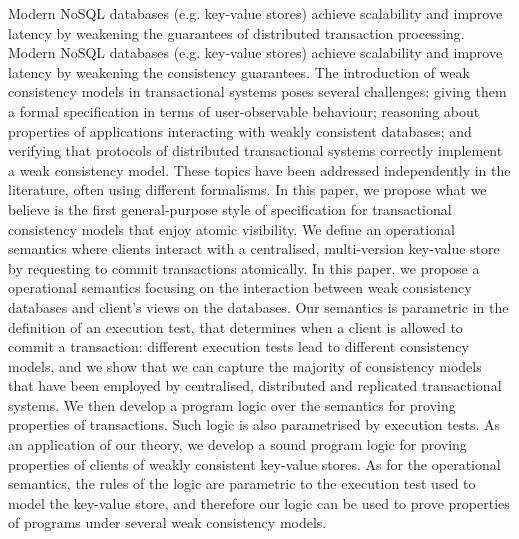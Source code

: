 \ac{Modern NoSQL databases (e.g. key-value stores) achieve scalability and improve 
latency by weakening the guarantees of distributed transaction 
processing. }
Modern NoSQL databases (e.g. key-value stores) achieve scalability and improve 
latency by weakening the consistency guarantees. 
The introduction of weak consistency models in transactional systems 
poses several challenges: giving them a formal specification in terms 
of user-observable behaviour; reasoning about properties of applications 
interacting with weakly consistent databases; and verifying that protocols 
of distributed transactional systems correctly implement a weak consistency model. 
These topics have been addressed independently in the literature, often using 
different formalisms. 
\ac{
In this paper, we propose what we believe is the first general-purpose style 
of specification for transactional consistency models that enjoy atomic visibility. 
We define an operational semantics where clients interact with a centralised, 
multi-version key-value store by requesting to commit transactions atomically. }
In this paper, we propose a operational semantics focusing on the interaction between 
weak consistency databases and client's views on the databases.
Our semantics is parametric in the definition of an execution test, that determines 
when a client is allowed to commit a transaction: different execution tests lead 
to different consistency models, and we show that we can capture the majority 
of consistency models that have been employed by centralised, distributed and replicated 
transactional systems. 
We then develop a program logic over the semantics for proving properties of transactions.
Such logic is also parametrised by execution tests.
\ac{
As an application of our theory, we develop a sound program logic for 
proving properties of clients of weakly consistent key-value stores. 
As for the operational semantics, the rules of the logic are parametric to the execution 
test used to model the key-value store, and therefore our logic can be used 
to prove properties of programs under several weak consistency models.}


